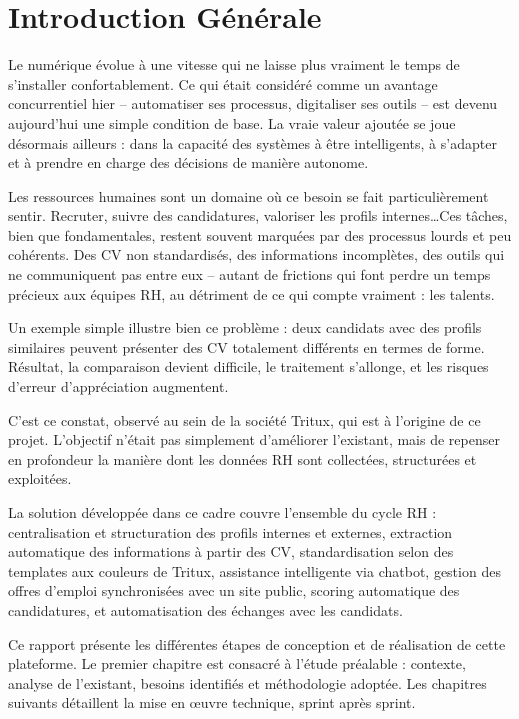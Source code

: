 \newpage
\chapter*{Introduction Générale}
\label{chap:intro-generale}

Le numérique évolue à une vitesse qui ne laisse plus vraiment le temps de s'installer confortablement. Ce qui était considéré comme un avantage concurrentiel hier -- automatiser ses processus, digitaliser ses outils -- est devenu aujourd'hui une simple condition de base. La vraie valeur ajoutée se joue désormais ailleurs : dans la capacité des systèmes à être intelligents, à s'adapter et à prendre en charge des décisions de manière autonome.

Les ressources humaines sont un domaine où ce besoin se fait particulièrement sentir. Recruter, suivre des candidatures, valoriser les profils internes\ldots Ces tâches, bien que fondamentales, restent souvent marquées par des processus lourds et peu cohérents. Des CV non standardisés, des informations incomplètes, des outils qui ne communiquent pas entre eux -- autant de frictions qui font perdre un temps précieux aux équipes RH, au détriment de ce qui compte vraiment : les talents.

Un exemple simple illustre bien ce problème : deux candidats avec des profils similaires peuvent présenter des CV totalement différents en termes de forme. Résultat, la comparaison devient difficile, le traitement s'allonge, et les risques d'erreur d'appréciation augmentent.

C'est ce constat, observé au sein de la société Tritux, qui est à l'origine de ce projet. L'objectif n'était pas simplement d'améliorer l'existant, mais de repenser en profondeur la manière dont les données RH sont collectées, structurées et exploitées.

La solution développée dans ce cadre couvre l'ensemble du cycle RH : centralisation et structuration des profils internes et externes, extraction automatique des informations à partir des CV, standardisation selon des templates aux couleurs de Tritux, assistance intelligente via chatbot, gestion des offres d'emploi synchronisées avec un site public, scoring automatique des candidatures, et automatisation des échanges avec les candidats.

Ce rapport présente les différentes étapes de conception et de réalisation de cette plateforme. Le premier chapitre est consacré à l'étude préalable : contexte, analyse de l'existant, besoins identifiés et méthodologie adoptée. Les chapitres suivants détaillent la mise en œuvre technique, sprint après sprint.

\vfill
